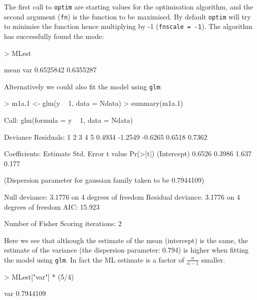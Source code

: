 \documentclass{article}
\begin{document}
\iftalk
\else
\fi

The first call to \texttt{optim} are starting values for the optimisation algorithm, and the second argument (\texttt{fn}) is the function to be maximised. By default \texttt{optim} will try to minimise the function hence multiplying by -1 (\texttt{fnscale = -1}).  The algorithm has successfully found the mode:

\begin{Schunk}
\begin{Sinput}
> MLest
\end{Sinput}
\begin{Soutput}
     mean       var 
0.6525842 0.6355287 
\end{Soutput}
\end{Schunk}

Alternatively we could also fit the model using \texttt{glm}:

\begin{Schunk}
\begin{Sinput}
> m1a.1 <- glm(y ~ 1, data = Ndata)
> summary(m1a.1)
\end{Sinput}
\begin{Soutput}
Call:
glm(formula = y ~ 1, data = Ndata)

Deviance Residuals: 
      1        2        3        4        5  
 0.4934  -1.2549  -0.6265   0.6518   0.7362  

Coefficients:
            Estimate Std. Error t value Pr(>|t|)
(Intercept)   0.6526     0.3986   1.637    0.177

(Dispersion parameter for gaussian family taken to be 0.7944109)

    Null deviance: 3.1776  on 4  degrees of freedom
Residual deviance: 3.1776  on 4  degrees of freedom
AIC: 15.923

Number of Fisher Scoring iterations: 2
\end{Soutput}
\end{Schunk}
 
Here we see that although the estimate of the mean (intercept) is the same, the estimate of the variance (the dispersion parameter: 0.794) is higher when fitting the model using \texttt{glm}. In fact the ML estimate is a factor of $\frac{n}{n-1}$ smaller.

\begin{Schunk}
\begin{Sinput}
> MLest["var"] * (5/4)
\end{Sinput}
\begin{Soutput}
      var 
0.7944109 
\end{Soutput}
\end{Schunk}
\end{document}
